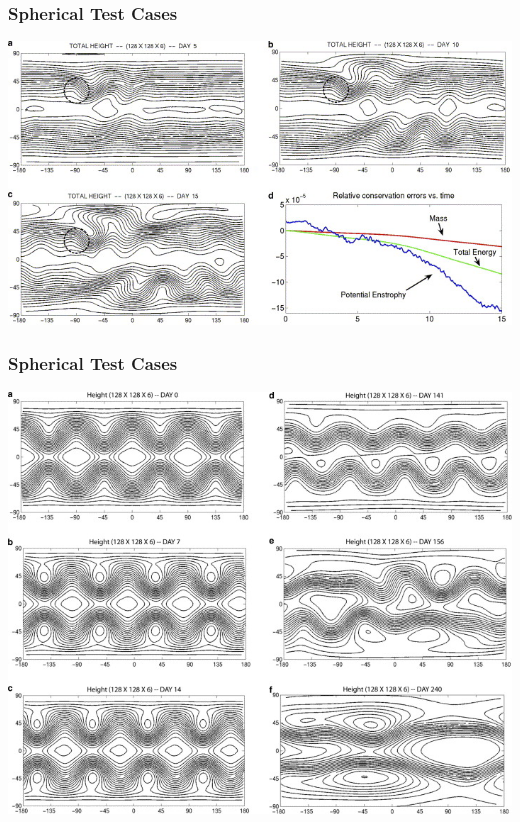 \documentclass[10pt]{beamer}
\begin{document}
      \begin{frame}
        \frametitle{Spherical Test Cases}
        \centering
        \includegraphics[scale=2.6]{Figures/mountain_test_problem.jpg}
      \end{frame}

      \begin{frame}
        \frametitle{Spherical Test Cases}
        \centering
        \includegraphics[scale=2.0]{Figures/rossby_test_case.jpg}
      \end{frame}
\end{document}
